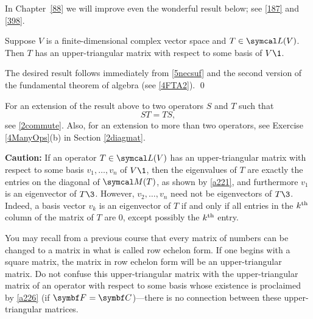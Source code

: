In Chapter~\ref{88} we will improve even the wonderful result below; see \ref{187} and \ref{398}.

{\label{a226} Suppose $V$ is a finite-dimensional complex vector space and $T \in \L(V)$. Then $T$ has an upper-triangular matrix with respect to some basis of $V\1$.}

\proof
The desired result follows immediately from \ref{5necsuf} and the second version of the fundamental theorem of algebra (see \ref{4FTA2}).
\qed




For an extension of the result above to two operators $S$ and $T$ such that
\[
ST = TS,
\]
see \ref{2commute}. Also, for an extension to more than two operators, see Exercise \ref{4ManyOps}(b) in Section \ref{2diagmat}.

\textbf{Caution:} If an operator $T\in\L(V)$ has an upper-triangular matrix with respect to some basis $v_1, \ldots, v_n$ of $V\1$, then the eigenvalues of $T$ are exactly the entries on the diagonal of $\M(T)$, as shown by \ref{a221}, and furthermore $v_1$ is an eigenvector of $T\3$. However, $v_2, \ldots, v_n$ need not be eigenvectors of $T\3$. Indeed, a basis vector $v_k$ is an eigenvector of $T$ if and only if all  entries in the $k^{\text{{th}}}$ column of the matrix of $T$ are $0$, except possibly the $k^{\text{{th}}}$ entry.


You may recall from a previous course that every matrix of numbers can be changed to a matrix in what is called row echelon form. If one begins with a square matrix, the matrix in row echelon form will be an upper-triangular matrix.
Do not confuse this upper-triangular matrix with the upper-triangular matrix of an operator with respect to some basis whose existence is proclaimed by \ref{a226} (if $\F{} = \C{}$)---there is no connection between these upper-triangular matrices.

